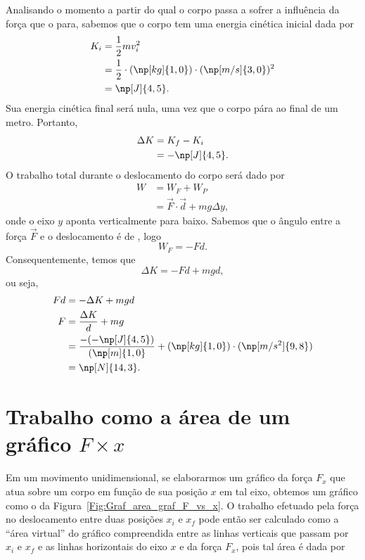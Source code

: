 Analisando o momento a partir do qual o corpo passa a sofrer a influência da força que o para, sabemos que o corpo tem uma energia cinética inicial dada por
\begin{align}
    K_i &= \frac{1}{2}mv_i^2 \\
    &= \frac{1}{2} \cdot(\np[kg]{1,0})\cdot(\np[m/s]{3,0})^2 \\
    &= \np[J]{4,5}.
\end{align}
%
Sua energia cinética final será nula, uma vez que o corpo pára ao final de um metro. Portanto,
\begin{align}
    \Delta K &= K_f - K_i \\
    &= -\np[J]{4,5}.
\end{align}
%
O trabalho total durante o deslocamento do corpo será dado por
\begin{align}
    W &= W_F + W_P \\
    &= \vec{F}\cdot\vec{d} + mg\Delta y,
\end{align}
%
onde o eixo $y$ aponta verticalmente para baixo. Sabemos que o ângulo entre a força $\vec{F}$ e o deslocamento é de , logo
\begin{equation}
    W_F = -Fd.
\end{equation}
%
Consequentemente, temos que
\begin{equation}
    \Delta K = -Fd + mg d,
\end{equation}
%
ou seja,
\begin{align}
    Fd &= -\Delta K + mgd \\
    F &= \frac{\Delta K}{d} + mg \\
    &= \frac{-(-\np[J]{4,5})}{(\np[m]{1,0}} + (\np[kg]{1,0})\cdot(\np[m/s^2]{9,8}) \\
    &= \np[N]{14,3}.
\end{align}

\section{Trabalho como a área de um gráfico $F \times x$}

Em um movimento unidimensional, se elaborarmos um gráfico da força $F_x$ que atua sobre um corpo em função de sua posição $x$ em tal eixo, obtemos um gráfico como o da Figura~\ref{Fig:Graf_area_graf_F_vs_x}. O trabalho efetuado pela força no deslocamento entre duas posições $x_i$ e $x_f$ pode então ser calculado como a ``área virtual'' do gráfico compreendida entre as linhas verticais que passam por $x_i$ e $x_f$ e as linhas horizontais do eixo $x$ e da força $F_x$, pois tal área é dada por

